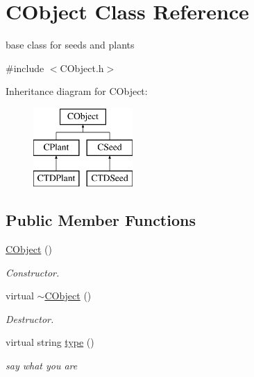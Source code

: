 \hypertarget{class_c_object}{}\section{C\+Object Class Reference}
\label{class_c_object}


base class for seeds and plants  




{\ttfamily \#include $<$C\+Object.\+h$>$}

Inheritance diagram for C\+Object\+:\begin{figure}[H]
\begin{center}
\leavevmode
\includegraphics[height=3.000000cm]{class_c_object}
\end{center}
\end{figure}
\subsection*{Public Member Functions}
\begin{DoxyCompactItemize}
\item 
\mbox{\label{class_c_object_ac44111d5ac75248a616df61b038c4153}} 
\mbox{\hyperlink{class_c_object_ac44111d5ac75248a616df61b038c4153}{C\+Object}} ()
\begin{DoxyCompactList}\small\item\em Constructor. \end{DoxyCompactList}\item 
\mbox{\label{class_c_object_adab4f75d2863e088087cd4556f8f37ad}} 
virtual \mbox{\hyperlink{class_c_object_adab4f75d2863e088087cd4556f8f37ad}{$\sim$\+C\+Object}} ()
\begin{DoxyCompactList}\small\item\em Destructor. \end{DoxyCompactList}\item 
\mbox{\label{class_c_object_aa734daa745223aa287c3fdfb8dfca1ed}} 
virtual string \mbox{\hyperlink{class_c_object_aa734daa745223aa287c3fdfb8dfca1ed}{type}} ()
\begin{DoxyCompactList}\small\item\em say what you are \end{DoxyCompactList}\end{DoxyCompactItemize}


